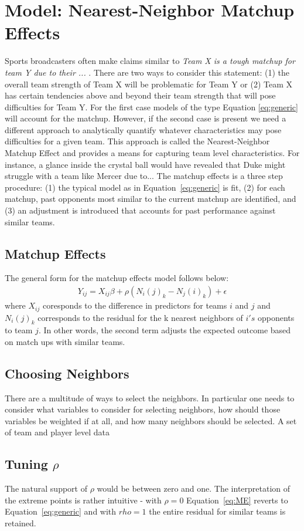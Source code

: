 \section{Model: Nearest-Neighbor Matchup Effects}
Sports broadcasters often make claims similar to \emph{Team X is a tough matchup for team Y due to their ... }.  There are two ways to consider this statement: (1) the overall team strength of Team X will be problematic for Team Y or (2) Team X has certain tendencies above and beyond their team strength that will pose difficulties for Team Y.  For the first case models of the type Equation \ref{eq:generic} will account for the matchup.  However, if the second case is present we need a different approach to analytically quantify whatever characteristics may pose difficulties for a given team.  This approach is called the Nearest-Neighbor Matchup Effect and provides a means for capturing team level characteristics.  For instance, a glance inside the crystal ball would have revealed that Duke might struggle with a team like Mercer due to...  The matchup effects is a three step procedure: (1)  the typical model as in Equation~\ref{eq:generic} is fit, (2) for each matchup, past opponents most similar to the current matchup are identified, and (3) an adjustment is introduced that accounts for past performance against similar teams. 
\subsection{Matchup Effects}

The general form for the matchup effects model follows below:
\begin{eqnarray}
Y_{ij} = X_{ij} \beta + \rho( N_i(j)_k-N_j(i)_k) + \epsilon
\label{eq:ME}
\end{eqnarray}
where $X_{ij}$ coresponds to the difference in predictors for teams $i$ and $j$ and $ N_i(j)_k$ corresponds to the residual for the k nearest neighbors of $i's$ opponents to team $j$.  In other words, the second term adjusts the expected outcome based on match ups with similar teams.
\subsection{Choosing Neighbors}
There are a multitude of ways to select the neighbors.  In particular one needs to consider what variables to consider for selecting neighbors, how should those variables be weighted if at all, and how many neighbors should be selected.   
A set of team and player level data
\subsection{Tuning $\rho$}
The natural support of $\rho$ would be between zero and one.  The interpretation of the extreme points is rather intuitive - with $\rho = 0$ Equation~\ref{eq:ME} reverts to Equation~\ref{eq:generic} and with $rho = 1$ the entire residual for similar teams is retained.
